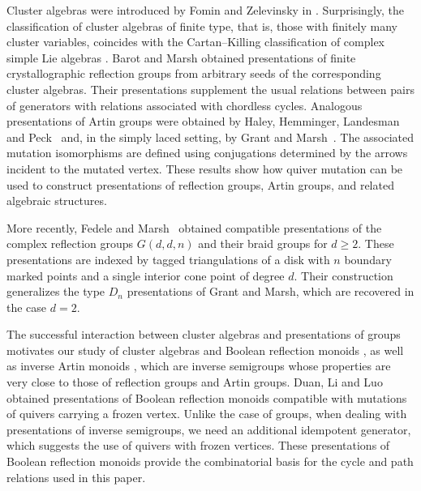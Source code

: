 \documentclass[a4paper, 12pt, reqno]{amsart}
\theoremstyle{definition}
\begin{document}
Cluster algebras were introduced by Fomin and Zelevinsky in \cite{FZ2002}. Surprisingly, the classification of cluster algebras of finite type, that is, those with finitely many cluster variables, coincides with the Cartan--Killing classification of complex simple Lie algebras \cite{FZ2003}. Barot and Marsh \cite{BM2015} obtained presentations of finite crystallographic reflection groups from arbitrary seeds of the corresponding cluster algebras. Their presentations supplement the usual relations between pairs of generators with relations associated with chordless cycles. Analogous presentations of Artin groups were obtained by Haley, Hemminger, Landesman and Peck~\cite{HHLP2017} and, in the simply laced setting, by Grant and Marsh~\cite{GM2017}. The associated mutation isomorphisms are defined using conjugations determined by the arrows incident to the mutated vertex. These results show how quiver mutation can be used to construct presentations of reflection groups, Artin groups, and related algebraic structures.

More recently, Fedele and Marsh~\cite{FM2026} obtained compatible presentations of the complex reflection groups $G(d,d,n)$ and their braid groups for $d\geq2$. These presentations are indexed by tagged triangulations of a disk with $n$ boundary marked points and a single interior cone point of degree $d$. Their construction generalizes the type $D_n$ presentations of Grant and Marsh, which are recovered in the case $d=2$.

The successful interaction between cluster algebras and presentations of groups motivates our study of cluster algebras and Boolean reflection monoids \cite{EF10,EF13}, as well as inverse Artin monoids \cite{Duan2025}, which are inverse semigroups whose properties are very close to those of reflection groups and Artin groups. Duan, Li and Luo \cite{DLL2020} obtained presentations of Boolean reflection monoids compatible with mutations of quivers carrying a frozen vertex. Unlike the case of groups, when dealing with presentations of inverse semigroups, we need an additional idempotent generator, which suggests the use of quivers with frozen vertices. These presentations of Boolean reflection monoids provide the combinatorial basis for the cycle and path relations used in this paper.
\end{document}
